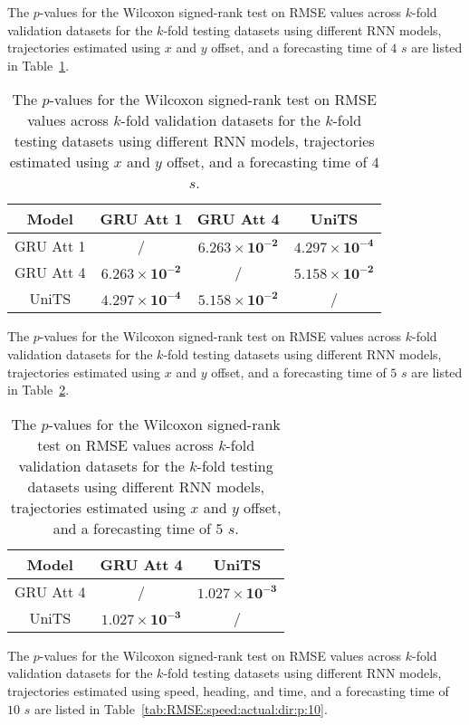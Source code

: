 The $p$-values for the Wilcoxon signed-rank test on RMSE values across $k$-fold validation datasets for the $k$-fold testing datasets using different RNN models, trajectories estimated using $x$ and $y$ offset, and a forecasting time of $4$ $s$ are listed in Table~\ref{tab:RMSE:no:abs:p:4}.

\begin{table}[!ht]
	\centering
	\begin{tabular}{|c|c|c|c|}
		\hline
		Model & GRU Att 1 & GRU Att 4 & UniTS \\ \hline
		GRU Att 1 & / & $\mathbf{6.263 \times 10^{-2}}$ & $\mathbf{4.297 \times 10^{-4}}$ \\ \hline
		GRU Att 4 & $\mathbf{6.263 \times 10^{-2}}$ & / & $\mathbf{5.158 \times 10^{-2}}$ \\ \hline
		UniTS & $\mathbf{4.297 \times 10^{-4}}$ & $\mathbf{5.158 \times 10^{-2}}$ & / \\ \hline
	\end{tabular}
	\caption{The $p$-values for the Wilcoxon signed-rank test on RMSE values across $k$-fold validation datasets for the $k$-fold testing datasets using different RNN models, trajectories estimated using $x$ and $y$ offset, and a forecasting time of $4$ $s$.}
	\label{tab:RMSE:no:abs:p:4}
\end{table}

The $p$-values for the Wilcoxon signed-rank test on RMSE values across $k$-fold validation datasets for the $k$-fold testing datasets using different RNN models, trajectories estimated using $x$ and $y$ offset, and a forecasting time of $5$ $s$ are listed in Table~\ref{tab:RMSE:no:abs:p:5}.

\begin{table}[!ht]
	\centering
	\begin{tabular}{|c|c|c|}
		\hline
		Model & GRU Att 4 & UniTS \\ \hline
		GRU Att 4 & / & $\mathbf{1.027 \times 10^{-3}}$ \\ \hline
		UniTS & $\mathbf{1.027 \times 10^{-3}}$ & / \\ \hline
	\end{tabular}
	\caption{The $p$-values for the Wilcoxon signed-rank test on RMSE values across $k$-fold validation datasets for the $k$-fold testing datasets using different RNN models, trajectories estimated using $x$ and $y$ offset, and a forecasting time of $5$ $s$.}
	\label{tab:RMSE:no:abs:p:5}
\end{table}

The $p$-values for the Wilcoxon signed-rank test on RMSE values across $k$-fold validation datasets for the $k$-fold testing datasets using different RNN models, trajectories estimated using speed, heading, and time, and a forecasting time of $10$ $s$ are listed in Table~\ref{tab:RMSE:speed:actual:dir:p:10}.

